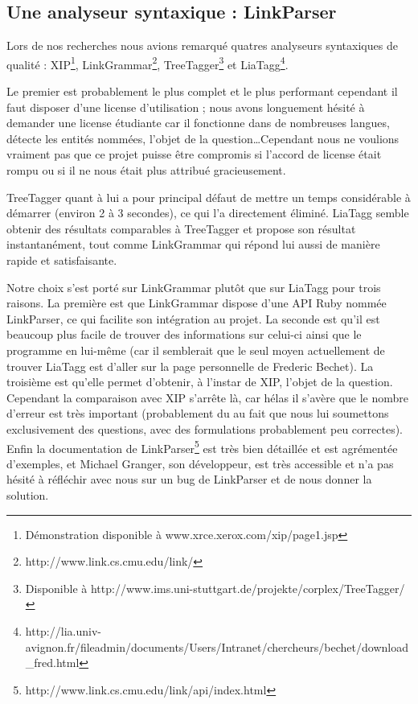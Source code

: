 \documentclass[10pt,a4paper]{article}
\begin{document}
\subsection{Une analyseur syntaxique : LinkParser}
\par Lors de nos recherches nous avions remarqué quatres analyseurs syntaxiques de qualité : XIP\footnote{Démonstration disponible à www.xrce.xerox.com/xip/page1.jsp}, LinkGrammar\footnote{http://www.link.cs.cmu.edu/link/}, TreeTagger\footnote{Disponible à http://www.ims.uni-stuttgart.de/projekte/corplex/TreeTagger/} et LiaTagg\footnote{http://lia.univ-avignon.fr/fileadmin/documents/Users/Intranet/chercheurs/bechet/download\_fred.html}.
\par Le premier est probablement le plus complet et le plus performant cependant il faut disposer d'une license d'utilisation ; nous avons longuement hésité à demander une license étudiante car il fonctionne dans de nombreuses langues, détecte les entités nommées, l'objet de la question\ldots Cependant nous ne voulions vraiment pas que ce projet puisse être compromis si l'accord de license était rompu ou si il ne nous était plus attribué gracieusement.
\par TreeTagger quant à lui a pour principal défaut de mettre un temps considérable à démarrer (environ 2 à 3 secondes), ce qui l'a directement éliminé. LiaTagg semble obtenir des résultats comparables à TreeTagger et propose son résultat instantanément, tout comme LinkGrammar qui répond lui aussi de manière rapide et satisfaisante.
\par Notre choix s'est porté sur LinkGrammar plutôt que sur LiaTagg pour trois raisons. La première est que LinkGrammar dispose d'une API Ruby nommée LinkParser, ce qui facilite son intégration au projet. La seconde est qu'il est beaucoup plus facile de trouver des informations sur celui-ci ainsi que le programme en lui-même (car il semblerait que le seul moyen actuellement de trouver LiaTagg est d'aller sur la page personnelle de Frederic Bechet). La troisième est qu'elle permet d'obtenir, à l'instar de XIP, l'objet de la question. Cependant la comparaison avec XIP s'arrête là, car hélas il s'avère que le nombre d'erreur est très important (probablement du au fait que nous lui soumettons exclusivement des questions, avec des formulations probablement peu correctes). Enfin la documentation de LinkParser\footnote{http://www.link.cs.cmu.edu/link/api/index.html} est très bien détaillée et est agrémentée d'exemples, et Michael Granger, son développeur, est très accessible et n'a pas hésité à réfléchir avec nous sur un bug de LinkParser et de nous donner la solution.
\end{document}
